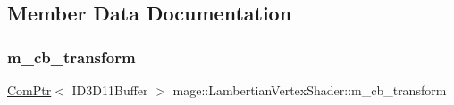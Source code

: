 \subsection{Member Data Documentation}
\hypertarget{classmage_1_1_lambertian_vertex_shader_aae0f2411821315d89eeb982e6c30c22e}{}\label{classmage_1_1_lambertian_vertex_shader_aae0f2411821315d89eeb982e6c30c22e} 
\subsubsection{\texorpdfstring{m\+\_\+cb\+\_\+transform}{m\_cb\_transform}}
{\footnotesize\ttfamily \hyperlink{namespacemage_ae74f374780900893caa5555d1031fd79}{Com\+Ptr}$<$ I\+D3\+D11\+Buffer $>$ mage\+::\+Lambertian\+Vertex\+Shader\+::m\+\_\+cb\+\_\+transform\hspace{0.3cm}{\ttfamily [private]}}

